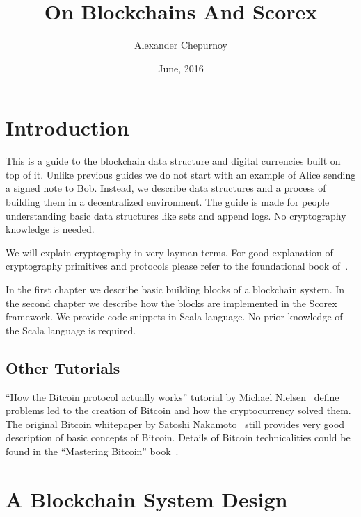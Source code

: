 \documentclass[]{report}   %
\begin{document}
\lstset{language=Scala}

\title{On Blockchains And Scorex}   %
\author{Alexander Chepurnoy}         %
\date{June, 2016}    %
\maketitle


\chapter{Introduction}

This is a guide to the blockchain data structure and digital currencies built on top of it. Unlike previous guides we do not start with an example of Alice sending a signed note to Bob. Instead, we describe data structures and a process of building them in a decentralized environment. The guide is made for people understanding basic data structures like sets and append logs. No cryptography knowledge is needed.

We will explain cryptography in very layman terms. For good explanation of cryptography primitives and protocols please refer to the foundational book of~\cite{katz2014introduction}. 

In the first chapter we describe basic building blocks of a blockchain system. In the second chapter we describe how the blocks are implemented in the Scorex framework. We provide code snippets in Scala language. No prior knowledge of the Scala language is required.

\section{Other Tutorials}

``How the Bitcoin protocol actually works'' tutorial by Michael Nielsen~\cite{nielsen} define problems led to the creation of Bitcoin and how the cryptocurrency solved them. The original Bitcoin whitepaper by Satoshi Nakamoto~\cite{Nakamoto2008} still provides very good description of basic concepts of Bitcoin. Details of Bitcoin technicalities could be found in the ``Mastering Bitcoin'' book~\cite{antonopoulos2014mastering}.


\chapter{A Blockchain System Design}             %
\end{document}
